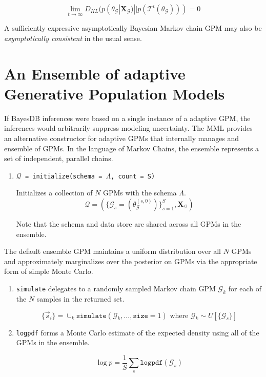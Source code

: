 \documentclass[10pt,letterpaper]{article}
\newcommand{\set}[1]{\{#1\}}
\begin{document}
\begin{equation*}
\lim_{t\to\infty}D_{KL}(p(\theta_\mathcal{G}|\mathbf{X_\mathcal{G}}) ||
p(\mathcal{T}^t(\theta_\mathcal{G}))) = 0
\end{equation*}

A sufficiently expressive asymptotically Bayesian Markov chain GPM may also be
\textit{asymptotically consistent} in the usual sense.

\section{An Ensemble of adaptive Generative Population Models}
\label{sec:ensemble}

If BayesDB inferences were based on a single instance of a adaptive GPM, the
inferences would arbitrarily suppress modeling uncertainty. The MML provides an
alternative constructor for adaptive GPMs that internally manages and ensemble
of GPMs. In the language of Markov Chains, the ensemble represents a set of
independent, parallel chains.

\begin{enumerate}
\item \texttt{$\mathcal{Q}$ = initialize(schema = $\Lambda$, count = S)}

    Initializes a collection of $N$ GPMs with the schema $\Lambda$.
    $$
    \mathcal{Q} = 
    (\set{\mathcal{G}_s = (\theta_{\mathcal{G}}^{(s,0)})}_{s=1}^S,
    \mathbf{X_\mathcal{Q}})
    $$

    Note that the schema and data store are shared across all GPMs in the
    ensemble.
\end{enumerate}

The default ensemble GPM maintains a uniform distribution over all $N$ GPMs and
approximately marginalizes over the posterior on GPMs via the appropriate form
of simple Monte Carlo.

\begin{enumerate}
\item \texttt{simulate} delegates to a randomly sampled Markov chain GPM
$\mathcal{G}_k$ for each of the $N$ samples in the returned set.

    $$
    \set{\vec{s}_i} = \cup_k \texttt{simulate} (\mathcal{G}_k,\dots,\texttt{size} = 1) \text{ where }
    \mathcal{G}_k \sim U[\set{\mathcal{G}_s}]
    $$

\item \texttt{logpdf} forms a Monte Carlo estimate of the expected density using
all of the GPMs in the ensemble.

    $$
    \log p = \frac{1}{S}\sum_s\texttt{logpdf}(\mathcal{G}_s)
    $$
\end{enumerate}
\end{document}
